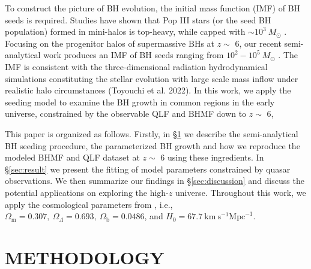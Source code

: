 \documentclass[twocolumn, twocolappendix]{aastex63}
\newcommand{\Msun}{M_\odot}
\begin{document}
\begin{CJK*}{UTF8}{gbsn}
To construct the picture of BH evolution, the initial mass function (IMF) of BH seeds is required.
Studies have shown that Pop III stars (or the seed BH population) formed in mini-halos is top-heavy, while capped with $\sim 10^3~\Msun$ 
\citep{2014ApJ...781...60H,2015MNRAS.448..568H}.
Focusing on the progenitor halos of supermassive BHs at $z\sim$ 6, 
our recent semi-analytical work produces an IMF of BH seeds ranging from $10^2-10^5~\Msun$ \citep{2021ApJ...917...60L}. 
The IMF is consistent with the three-dimensional radiation hydrodynamical simulations 
constituting the stellar evolution with large scale mass inflow under realistic halo circumstances (Toyouchi et al. 2022).
In this work, we apply the seeding model to examine the BH growth in common regions in the early universe, 
constrained by the observable QLF and BHMF down to $z\sim$ 6, 

This paper is organized as follows. Firstly, in \S \ref{sec:method} we describe the semi-analytical BH seeding procedure, 
the parameterized BH growth and how we reproduce the modeled BHMF and QLF dataset at $z\sim$ 6 using these ingredients. 
In \S \ref{sec:result} we present the fitting of model parameters constrained by quasar observations. 
We then summarize our findings in \S \ref{sec:discussion} and discuss the potential applications on exploring the high-$z$ universe.
Throughout this work, we apply the cosmological parameters from \cite{2016A&A...594A..13P},
i.e., $\Omega_{\mathrm{m}}=0.307,~\Omega_{\Lambda}=0.693,~
\Omega_{\mathrm{b}}=0.0486$, and $H_0=67.7 \mathrm{~km} \mathrm{~s}^{-1} \mathrm{Mpc}^{-1}$.

\vspace{5mm}
\section{METHODOLOGY}\label{sec:method}

\vspace{2mm}

\end{CJK*}
\end{document}
